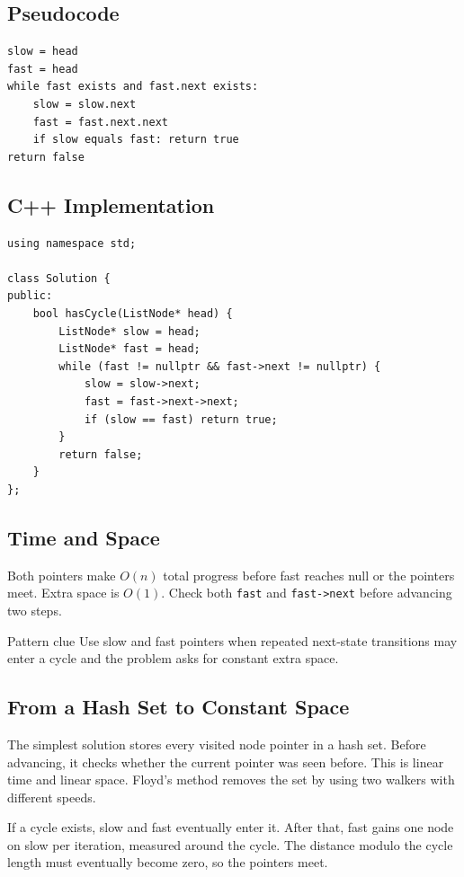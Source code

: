 \subsection{Pseudocode}
\begin{lstlisting}[style=pseudocode]
slow = head
fast = head
while fast exists and fast.next exists:
    slow = slow.next
    fast = fast.next.next
    if slow equals fast: return true
return false
\end{lstlisting}

\subsection{C++ Implementation}
\begin{lstlisting}[style=compactcode,caption={Complete C++ solution: Linked List Cycle}]
using namespace std;

class Solution {
public:
    bool hasCycle(ListNode* head) {
        ListNode* slow = head;
        ListNode* fast = head;
        while (fast != nullptr && fast->next != nullptr) {
            slow = slow->next;
            fast = fast->next->next;
            if (slow == fast) return true;
        }
        return false;
    }
};
\end{lstlisting}

\subsection{Time and Space}
Both pointers make \(O(n)\) total progress before fast reaches null or the
pointers meet. Extra space is \(O(1)\). Check both \texttt{fast} and
\texttt{fast->next} before advancing two steps.

\begin{revisionbox}{Pattern clue}
Use slow and fast pointers when repeated next-state transitions may enter a
cycle and the problem asks for constant extra space.
\end{revisionbox}

\subsection{From a Hash Set to Constant Space}
The simplest solution stores every visited node pointer in a hash set. Before
advancing, it checks whether the current pointer was seen before. This is
linear time and linear space. Floyd's method removes the set by using two
walkers with different speeds.

If a cycle exists, slow and fast eventually enter it. After that, fast gains
one node on slow per iteration, measured around the cycle. The distance
modulo the cycle length must eventually become zero, so the pointers meet.

